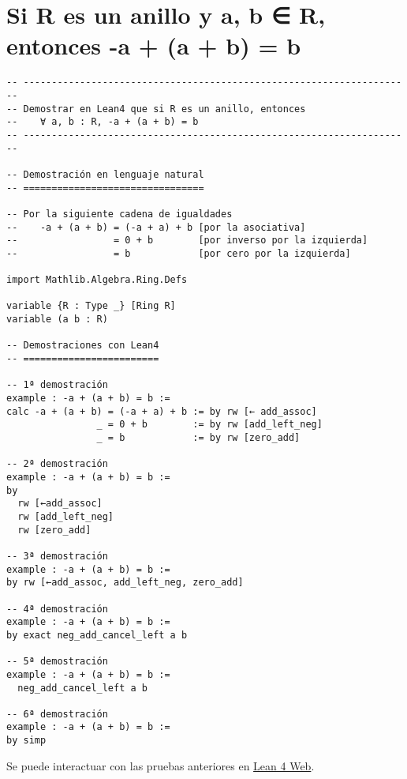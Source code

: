 \section{Si R es un anillo y a, b ∈ R, entonces -a + (a + b) = b}
\label{sec:org551b6f6}
\begin{verbatim}
-- ---------------------------------------------------------------------
-- Demostrar en Lean4 que si R es un anillo, entonces
--    ∀ a, b : R, -a + (a + b) = b
-- ---------------------------------------------------------------------

-- Demostración en lenguaje natural
-- ================================

-- Por la siguiente cadena de igualdades
--    -a + (a + b) = (-a + a) + b [por la asociativa]
--                 = 0 + b        [por inverso por la izquierda]
--                 = b            [por cero por la izquierda]

import Mathlib.Algebra.Ring.Defs

variable {R : Type _} [Ring R]
variable (a b : R)

-- Demostraciones con Lean4
-- ========================

-- 1ª demostración
example : -a + (a + b) = b :=
calc -a + (a + b) = (-a + a) + b := by rw [← add_assoc]
                _ = 0 + b        := by rw [add_left_neg]
                _ = b            := by rw [zero_add]

-- 2ª demostración
example : -a + (a + b) = b :=
by
  rw [←add_assoc]
  rw [add_left_neg]
  rw [zero_add]

-- 3ª demostración
example : -a + (a + b) = b :=
by rw [←add_assoc, add_left_neg, zero_add]

-- 4ª demostración
example : -a + (a + b) = b :=
by exact neg_add_cancel_left a b

-- 5ª demostración
example : -a + (a + b) = b :=
  neg_add_cancel_left a b

-- 6ª demostración
example : -a + (a + b) = b :=
by simp
\end{verbatim}
Se puede interactuar con las pruebas anteriores en \href{https://lean.math.hhu.de/\#url=https://raw.githubusercontent.com/jaalonso/Calculemus2/main/src/Opuesto\_se\_cancela\_con\_la\_suma\_por\_la\_izquierda.lean}{Lean 4 Web}.

